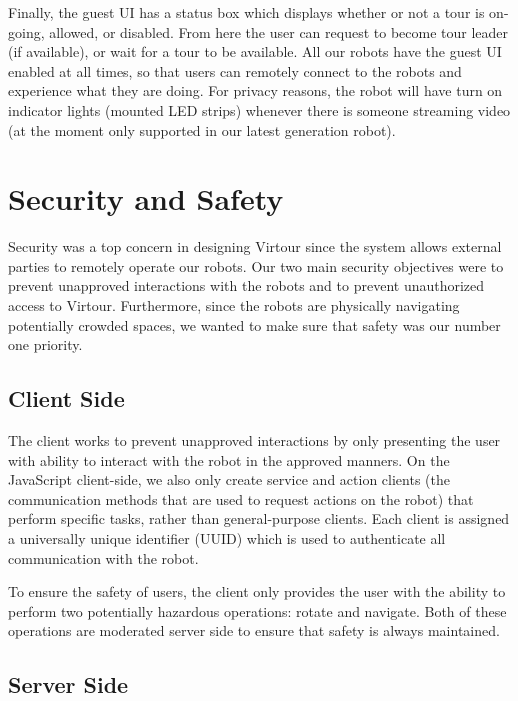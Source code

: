 \documentclass[
  oneside,
  11pt, a4paper,
  footinclude=true,
  headinclude=true,
  cleardoublepage=empty
]{article}
\begin{document}
Finally, the guest UI has a status box which displays whether or not a tour is
on-going, allowed, or disabled. From here the user can request to become tour
leader (if available), or wait for a tour to be available. All our robots have
the guest UI enabled at all times, so that users can remotely connect to the
robots and experience what they are doing. For privacy reasons, the robot will
have turn on indicator lights (mounted LED strips) whenever there is someone
streaming video (at the moment only supported in our latest generation robot).

\section{Security and Safety}\label{sec:security}

Security was a top concern in designing Virtour since the system allows
external parties to remotely operate our robots. Our two main security
objectives were to prevent unapproved interactions with the robots and to
prevent unauthorized access to Virtour. Furthermore, since the robots are
physically navigating potentially crowded spaces, we wanted to make sure that
safety was our number one priority.

\subsection{Client Side}

The client works to prevent unapproved interactions by only presenting the user
with ability to interact with the robot in the approved manners. On the
JavaScript client-side, we also only create service and action clients (the
communication methods that are used to request actions on the robot) that
perform specific tasks, rather than general-purpose clients. Each client is
assigned a universally unique identifier (UUID) which is used to authenticate
all communication with the robot.

To ensure the safety of users, the client only provides the user with the
ability to perform two potentially hazardous operations: rotate and navigate.
Both of these operations are moderated server side to ensure that safety is
always maintained.

\subsection{Server Side}
\end{document}
